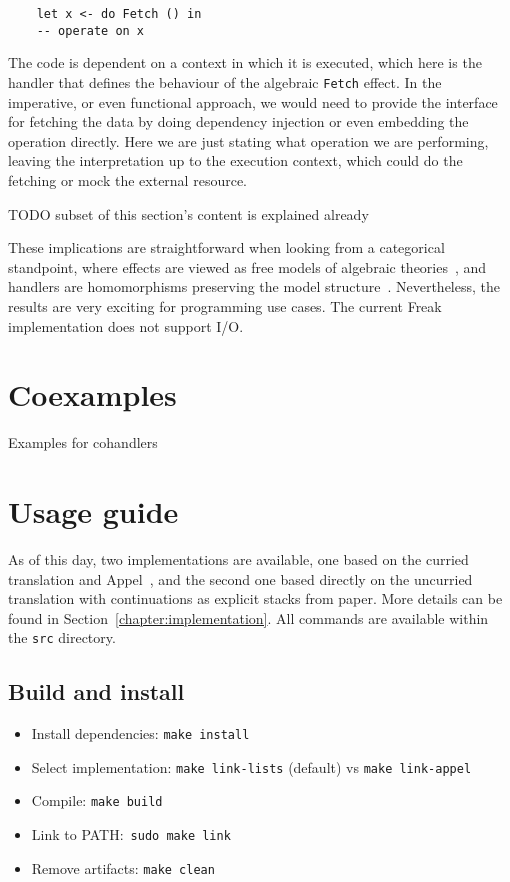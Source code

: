 \documentclass[declaration,shortabstract]{iithesis}
\theoremstyle{definition} \newtheorem{definition}{Definition}[chapter]
\theoremstyle{remark} \newtheorem{remark}[definition]{Observation}
\theoremstyle{plain} \newtheorem{theorem}[definition]{Theorem}
\theoremstyle{plain} \newtheorem{lemma}[definition]{Lemma}
\begin{document}
\begin{verbatim}
    let x <- do Fetch () in
    -- operate on x
\end{verbatim}

    The code is dependent on a context in which it is executed, which here is
    the handler that defines the behaviour of the algebraic \verb!Fetch! effect.
    In the imperative, or even functional approach, we would need to provide
    the interface for fetching the data by doing dependency injection or even
    embedding the operation directly. Here we are just stating what operation
    we are performing, leaving the interpretation up to the execution context,
    which could do the fetching or mock the external resource.

    \noindent
    TODO subset of this section's content is explained already

    These implications are straightforward when looking from a categorical standpoint,
    where effects are viewed as free models of algebraic theories~\cite{adequacy},
    and handlers are homomorphisms preserving the model structure~\cite{handlers}.
    Nevertheless, the results are very exciting for programming use cases. The current
    Freak implementation does not support I/O.

\section{Coexamples}

    Examples for cohandlers

\section{Usage guide}

    As of this day, two implementations are available, one based on the curried
    translation and Appel~\cite{appel-continuations}, and the second one based
    directly on the uncurried translation with continuations as explicit stacks
    from paper. More details can be found in Section~\ref{chapter:implementation}.
    All commands are available within the \verb!src! directory.

    \subsection{Build and install}

    \begin{itemize}
        \item Install dependencies: \verb!make install!
        \item Select implementation: \verb!make link-lists! (default) vs \verb!make link-appel!
        \item Compile: \verb!make build!
        \item Link to PATH:~\verb!sudo make link!
        \item Remove artifacts: \verb!make clean!
    \end{itemize}
\end{document}
